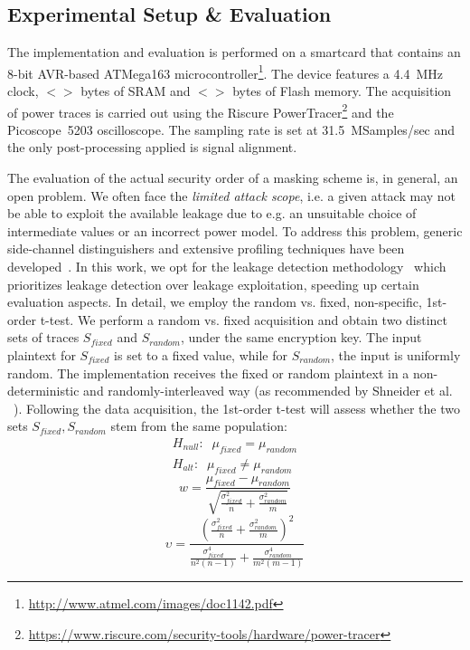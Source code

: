 \subsection{Experimental Setup \& Evaluation}
The implementation and evaluation is performed on a smartcard that contains an 8-bit AVR-based ATMega163 microcontroller\footnote{\url{http://www.atmel.com/images/doc1142.pdf}}. 
The device features a 4.4~MHz clock, $<>$ bytes of SRAM and $<>$ bytes of Flash memory. 
The acquisition of power traces is carried out using the Riscure PowerTracer\footnote{\url{https://www.riscure.com/security-tools/hardware/power-tracer}} and the Picoscope~5203 oscilloscope. The sampling rate is set at 31.5~MSamples/sec and the only post-processing applied is signal alignment.

The evaluation of the actual security order of a masking scheme is, in general, an open problem. We often face the \emph{limited attack scope}, i.e. a given attack may not be able to exploit the available leakage due to e.g. an unsuitable choice of intermediate values or an incorrect power model. To address this problem, generic side-channel distinguishers and extensive profiling techniques have been developed~\cite{DBLP:journals/joc/BatinaGPRSV11,DBLP:conf/cardis/WhitnallOM11,DBLP:conf/eurocrypt/StandaertMY09}. In this work, we opt for the
leakage detection methodology~\cite{tvla} which prioritizes leakage detection over leakage exploitation, speeding up certain evaluation aspects. In detail, we employ the random vs. fixed, non-specific, 1st-order t-test. We perform a random vs. fixed acquisition and obtain two distinct sets of traces $S_{fixed}$ and $S_{random}$, under the same encryption key. The input plaintext for $S_{fixed}$ is set to a fixed value, while for $S_{random}$, the input is uniformly random. The implementation receives the fixed or random plaintext in a non-deterministic and randomly-interleaved way (as recommended by Shneider et al. ~\cite{DBLP:conf/ches/SchneiderM15}). Following the data acquisition, the 1st-order t-test will assess whether the two sets $S_{fixed},S_{random}$ stem from the same population:
\begin{equation}
\begin{split}
H_{null}: \;\; \mu_{fixed} = \mu_{random} \\
H_{alt}: \;\; \mu_{fixed} \neq \mu_{random}
\end{split}
\end{equation}
\begin{equation}
w = \frac {\mu_{fixed} - \mu_{random}} {\sqrt{ \frac{\sigma_{fixed}^2}{n} + \frac{\sigma_{random}^2}   {m}  }  }
\end{equation}
\begin{equation}
\upsilon = \frac { (\frac{\sigma_{fixed}^2} {n}   + \frac{\sigma_{random}^2} {m}) ^2  } {\frac{\sigma_{fixed}^4} {n^2(n-1)} + \frac{\sigma_{random}^4} {m^2(m-1)}  }
\end{equation}

